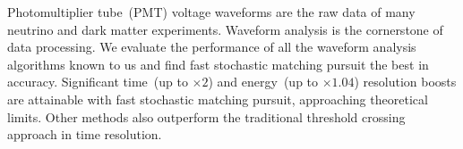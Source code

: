 Photomultiplier tube~(PMT) voltage waveforms are the raw data of many neutrino and dark matter experiments. Waveform analysis is the cornerstone of data processing. We evaluate the performance of all the waveform analysis algorithms known to us and find fast stochastic matching pursuit the best in accuracy. Significant time~(up to $\times 2$) and energy~(up to $\times 1.04$) resolution boosts are attainable with fast stochastic matching pursuit, approaching theoretical limits.  Other methods also outperform the traditional threshold crossing approach in time resolution.
